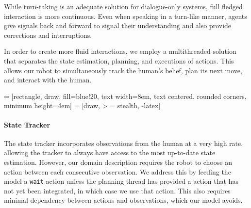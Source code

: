 \documentclass{article}
\begin{document}
While turn-taking is an adequate solution for dialogue-only systems, full fledged interaction is more continuous. Even when speaking in a turn-like manner, agents give signals back and forward to signal their understanding and also provide corrections and interruptions.

In order to create more fluid interactions, we employ a multithreaded solution that separates the state estimation, planning, and executions of actions. This allows our robot to simultaneously track the human's belief, plan its next move, and interact with the human. 


 = [rectangle, draw, fill=blue!20, text width=8em, text centered, rounded corners, minimum height=4em]
 = [draw, > = stealth, -latex]


\begin{center}
\end{center}




\paragraph{State Tracker} The state tracker incorporates observations from the human at a very high rate, allowing the tracker to always have access to the most up-to-date state estimation. However, our domain description requires the robot to choose an action between each consecutive observation. We address this by feeding the model a \texttt{wait} action unless the planning thread has provided a action that has not yet been integrated, in which case we use that action. This also requires minimal dependency between actions and observations, which our model avoids. 
\end{document}
